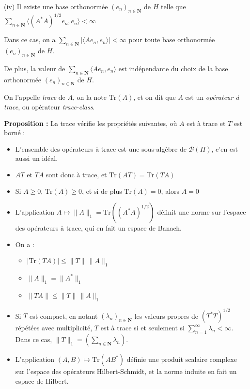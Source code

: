 \documentclass[12pt]{article}
\let\oldsum\sum
\renewcommand{\sum}{\oldsum\limits}
\begin{document}
(iv) Il existe une base orthonormée $(e_n)_{n\in\mathbf N}$ de $H$ telle que $ \displaystyle \sum_{n \in \mathbf N}\langle (A^* A)^{1/2}e_n, e_n \rangle < \infty $

Dans ce cas, on a $ \displaystyle \sum_{n \in \mathbf N} |\langle A e_n, e_n \rangle | < \infty $ pour toute base orthonormée $(e_n)_{n\in\mathbf N}$ de $H$.

De plus, la valeur de $ \displaystyle \sum_{n \in \mathbf N}\langle A e_n, e_n \rangle  $ est indépendante du choix de la base orthonormée $(e_n)_{n\in\mathbf N} $ de $H$. 

On l'appelle \textit{trace} de $A$, on la note $ \mathrm{Tr}(A) $, et on dit que $A$ est un \textit{opérateur à trace}, ou opérateur \textit{trace-class}.

\textbf{Proposition :} La trace vérifie les propriétés suivantes, où $A$ est à trace et $T$ est borné :

\begin{itemize}

  \item L'ensemble des opérateurs à trace est une sous-algèbre de $\mathcal B(H)$, c'en est aussi un idéal.

  \item $AT$ et $TA$ sont donc à trace, et $\mathrm{Tr}(AT) = \mathrm{Tr}(TA)$

  \item Si $A \geqslant 0$, $ \mathrm{Tr}(A) \geqslant 0$, et si de plus $ \mathrm{Tr}(A) = 0$, alors $A = 0$

  \item L'application $A \mapsto \|A\|_1 = \mathrm{Tr}((A^* A)^{1/2}) $ définit une norme sur l'espace des opérateurs à trace, qui en fait un espace de Banach.

  \item On a :
  
  \begin{itemize}
    
    \item $ |\mathrm{Tr}(TA)| \leqslant \|T\| \, \|A\|_1$ 
    
    \item $ \| A \|_1 =  \|A^* \|_1$

    \item $\| TA \| \leqslant  \|T\| \, \| A \|_1 $

  \end{itemize}

  \item Si $T$ est compact, en notant $(\lambda_n)_{n\in \mathbf N} $ les valeurs propres de $ (T^* T)^{1/2} $ répétées avec multiplicité, $T$ est à trace si et seulement si $ \displaystyle \sum_{n=1}^\infty \lambda_n < \infty $. Dans ce cas, $ \displaystyle \|T \|_1 = \left( \sum_{n \in \mathbf N} \lambda_n \right) $.

  \item L'application $(A,B) \mapsto \mathrm{Tr}(AB^*) $ définie une produit scalaire complexe sur l'espace des opérateurs Hilbert-Schmidt, et la norme induite en fait un espace de Hilbert.
  
\end{itemize}
\end{document}
